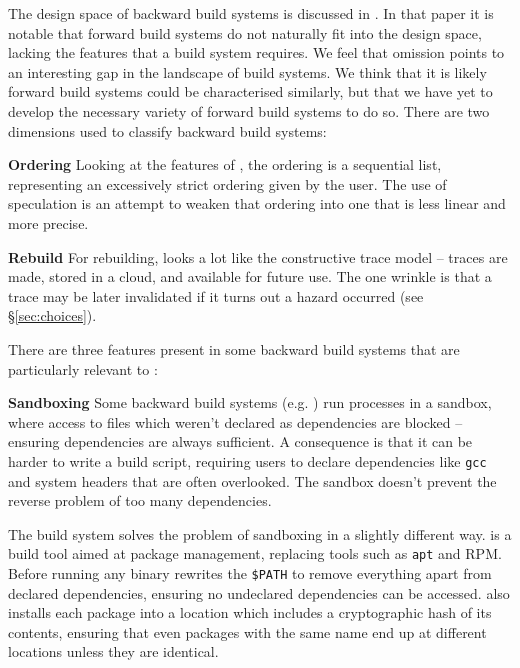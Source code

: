 The design space of backward build systems is discussed in \cite{build_systems_a_la_carte}. In that paper it is notable that forward build systems do not naturally fit into the design space, lacking the features that a build system requires. We feel that omission points to an interesting gap in the landscape of build systems. We think that it is likely forward build systems could be characterised similarly, but that we have yet to develop the necessary variety of forward build systems to do so. There are two dimensions used to classify backward build systems:

\textbf{Ordering} Looking at the features of \Rattle, the ordering is a sequential list, representing an excessively strict ordering given by the user. The use of speculation is an attempt to weaken that ordering into one that is less linear and more precise.

\textbf{Rebuild} For rebuilding, \Rattle looks a lot like the constructive trace model -- traces are made, stored in a cloud, and available for future use. The one wrinkle is that a trace may be later invalidated if it turns out a hazard occurred (see \S\ref{sec:choices}).

\postparagraphs

\noindent There are three features present in some backward build systems that are particularly relevant to \Rattle:

\textbf{Sandboxing} Some backward build systems (e.g. \Bazel \cite{bazel}) run processes in a sandbox, where access to files which weren't declared as dependencies are blocked -- ensuring dependencies are always sufficient. A consequence is that it can be harder to write a \Bazel build script, requiring users to declare dependencies like \texttt{gcc} and system headers that are often overlooked. The sandbox doesn't prevent the reverse problem of too many dependencies.

The \Nix build system \cite{nix} solves the problem of sandboxing in a slightly different way. \Nix is a build tool aimed at package management, replacing tools such as \texttt{apt} and RPM. Before running any binary \Nix rewrites the \texttt{\$PATH} to remove everything apart from declared dependencies, ensuring no undeclared dependencies can be accessed. \Nix also installs each package into a location which includes a cryptographic hash of its contents, ensuring that even packages with the same name end up at different locations unless they are identical.

